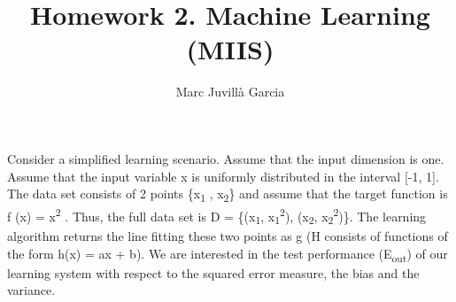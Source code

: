 \documentclass{article}
\author{Marc Juvillà Garcia}
\title{\vspace{-2cm}Homework 2. Machine Learning (MIIS)}
\begin{document}
\maketitle
Consider a simplified learning scenario. Assume that the input dimension is
one. Assume that the input variable x is uniformly distributed in the interval
[-1, 1]. The data set consists of 2 points \{x\textsubscript{1} , x\textsubscript{2}\} and assume that the target
function is f (x) = x\textsuperscript{2} . Thus, the full data set is D = \{(x\textsubscript{1}, x\textsubscript{1}\textsuperscript{2}), (x\textsubscript{2}, x\textsubscript{2}\textsuperscript{2})\}. The
learning algorithm returns the line fitting these two points as g (H consists of
functions of the form h(x) = ax + b). We are interested in the test performance
(E\textsubscript{out}) of our learning system with respect to the squared error measure, the
bias and the variance.
\end{document}
